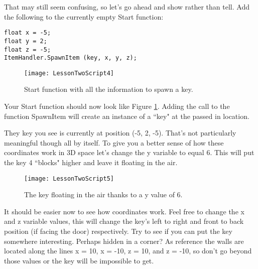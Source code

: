 \documentclass{article}
\begin{document}
That may still seem confusing, so let's go ahead and show rather than tell. Add the following to the currently empty Start function: 

\lstset{style=sharpc}
\begin{lstlisting}
float x = -5;
float y = 2;
float z = -5;
ItemHandler.SpawnItem (key, x, y, z);
\end{lstlisting}

\begin{figure}
  \texttt{[image: LessonTwoScript4]}
  \caption{Start function with all the information to spawn a key.}
  \label{fig:LessonTwoScript4}
\end{figure}

Your Start function should now look like Figure \ref{fig:LessonTwoScript4}. Adding the call to the function SpawnItem will create an instance of a ``key" at the passed in location.

\noindent{}

They key you see is currently at position (-5, 2, -5). That's not particularly meaningful though all by itself. To give you a better sense of how these coordinates work in 3D space let's change the y variable to equal 6. This will put the key 4 ``blocks" higher and leave it floating in the air. 

\noindent{}

\begin{figure}
  \texttt{[image: LessonTwoScript5]}
  \caption{The key floating in the air thanks to a y value of 6.}
  \label{fig:LessonTwoScript5}
\end{figure}

It should be easier now to see how coordinates work. Feel free to change the x and z variable values, this will change the key's left to right and front to back position (if facing the door) respectively. Try to see if you can put the key somewhere interesting. Perhaps hidden in a corner? As reference the walls are located along the lines x = 10, x = -10, z = 10, and z = -10, so don't go beyond those values or the key will be impossible to get.

\noindent{}
\end{document}
